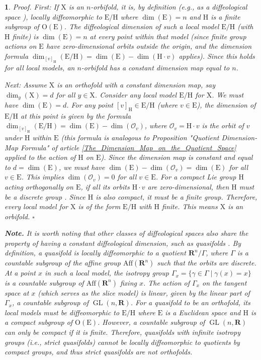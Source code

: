\documentclass[10pt,reqno,letterpaper,twoside]{amsart}
\theoremstyle{article}
\newtheorem{article}{}
\renewenvironment{proof}%
{\noindent\textit{Proof.}}%
{\nolinebreak\hfill $\square$}
\newcommand{\RR}{\mathbf{R}}
\newcommand{\cO}{{\mathcal O}}
\def \E{\mathrm E}
\def \H{\mathrm H}
\def \O{\mathrm O}
\def \X{\mathrm X}
\DeclareMathOperator{\GL}{GL}
\def \H{\mathrm H} %
\def \O{\mathrm O}
\begin{document}
\begin{article}
\begin{proof}
      First:
      If $\X$ is an $n$-orbifold,
      it is,
      by definition (e.g., as a diffeological space \cite{IKZ10}),
      locally diffeomorphic to $\E/\H$ where $\dim(\E)=n$ and $\H$ is a \emph{finite} subgroup of $\O(\E)$.
      The diffeological dimension of such a local model $\E/\H$ (with $\H$ finite) is $\dim(\E) = n$ at every point within that model (since finite group actions on $\E$ have zero-dimensional orbits outside the origin,
      and the dimension formula $\dim_{[v]_\H}(\E/\H) = \dim(\E) - \dim(\H \cdot v)$ applies).
      Since this holds for all local models,
      an $n$-orbifold has a constant dimension map equal to $n$.
      
      Next:
      Assume $\X$ is an orthofold with a constant dimension map,
      say $\dim_y(\X) = d$ for all $y \in \X$.
      Consider any local model $\E/\H$ for $\X$.
      We must have $\dim(\E) = d$. For any point $[v]_\H \in \E/\H$ (where $v \in \E$),
      the dimension of $\E/\H$ at this point is given by the formula $\dim_{[v]_\H}(\E/\H) = \dim(\E) - \dim(\cO_v)$,
      where $\cO_v = \H \cdot v$ is the orbit of $v$ under $\H$ within $\E$
      (this formula is analogous to Proposition "Quotient Dimension-Map Formula" of article \ref{The_Dimension_Map_on_the_Quotient_Space} applied to the action of $\H$ on $\E$).
      Since the dimension map is constant and equal to $d = \dim(\E)$,
      we must have $\dim(\E) - \dim(\cO_v) = \dim(\E)$ for all $v \in \E$.
      This implies $\dim(\cO_v) = 0$ for all $v \in \E$.
      For a compact Lie group $\H$ acting orthogonally on $\E$,
      if all its orbits $\H \cdot v$ are zero-dimensional,
      then $\H$ must be a discrete group \cite[]{PIZ13}.
      Since $\H$ is also compact,
      it must be a finite group.
      Therefore,
      every local model for $\X$ is of the form $\E/\H$ with $\H$ finite.
      This means $\X$ is an orbifold.
    \end{proof}
    
    \textbf{Note.} It is worth noting that other classes of diffeological spaces also share the property of having a constant diffeological dimension,
    such as \emph{quasifolds} \cite{IZP21}.
    By definition,
    a quasifold is locally diffeomorphic to a quotient $\RR^n/\Gamma$,
    where $\Gamma$ is a countable subgroup of the affine group $\mathrm{Aff}(\RR^n)$ such that the orbits are discrete.
    At a point $x$ in such a local model,
    the isotropy group $\Gamma_x = \{ \gamma \in \Gamma \mid \gamma(x)=x \}$ is a countable subgroup of $\mathrm{Aff}(\RR^n)$ fixing $x$.
    The action of $\Gamma_x$ on the tangent space at $x$ (which serves as the slice model) is linear,
    given by the linear part of $\Gamma_x$, a countable subgroup of $\GL(n,\RR)$.
    For a quasifold to be an orthofold,
    its local models must be diffeomorphic to $\E/\H$ where $\E$ is a Euclidean space and $\H$ is a compact subgroup of $\O(\E)$.
    However,
    a countable subgroup of $\GL(n,\RR)$ can only be compact if it is finite.
    Therefore,
    quasifolds with infinite isotropy groups
    (i.e., strict quasifolds)
    cannot be locally diffeomorphic to quotients by compact groups,
    and thus strict quasifolds are not orthofolds.
    

\end{article}
\end{document}
